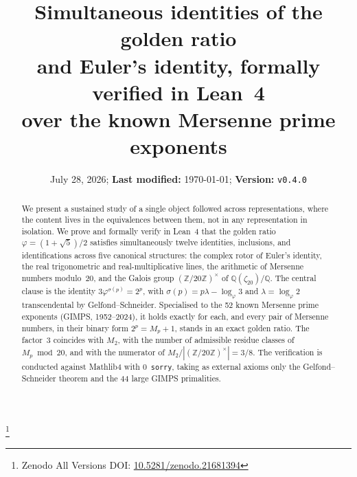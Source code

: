 \documentclass[11pt,reqno]{amsart}
\numberwithin{equation}{section}
\theoremstyle{definition}
\newcommand{\golden}{\varphi}
\newcommand{\Mp}{M_{p}}
\newcommand{\Ztwenty}{(\mathbb{Z}/20\mathbb{Z})^{\times}}
\begin{document}
\title[Simultaneous identities of the golden ratio and Euler's identity]
      {Simultaneous identities of the golden ratio\\
       and Euler's identity, formally verified in Lean~4\\
       over the known Mersenne prime exponents}
\thanks{Zenodo All Versions DOI: \href{https://doi.org/10.5281/zenodo.21681394}{10.5281/zenodo.21681394}}

\renewcommand{\datename}{\textbf{Received:}}
\date{July 28, 2026; \textbf{Last modified:} \today; \textbf{Version:} \texttt{v0.4.0}}



\begin{abstract}
We present a sustained study of a single object followed across
representations, where the content lives in the equivalences between them,
not in any representation in isolation.  We prove and formally verify in
Lean~4 that the golden ratio
$\golden=(1+\sqrt5)/2$ satisfies simultaneously twelve identities,
inclusions, and identifications across five canonical structures: the
complex rotor of Euler's identity, the real trigonometric and
real-multiplicative lines, the arithmetic of Mersenne numbers
modulo~20, and the Galois group $\Ztwenty$ of
$\mathbb{Q}(\zeta_{20})/\mathbb{Q}$. The central clause is the identity
$3\golden^{\sigma(p)}=2^{p}$, with $\sigma(p)=p\lambda-\log_\golden 3$
and $\lambda=\log_\golden 2$ transcendental by Gelfond--Schneider.
Specialised to the 52 known Mersenne prime exponents (GIMPS,
1952--2024), it holds exactly for each, and every pair of Mersenne
numbers, in their binary form $2^{p}=M_{p}+1$, stands in an exact golden
ratio. The factor~3 coincides with
$M_{2}$, with the number of admissible residue classes of
$\Mp\bmod 20$, and with the numerator of $M_{2}/|\Ztwenty|=3/8$. The
verification is conducted against Mathlib4 with $0$~\texttt{sorry}, taking as external
axioms only the Gelfond--Schneider theorem and the 44 large GIMPS
primalities.
\end{abstract}
\end{document}
